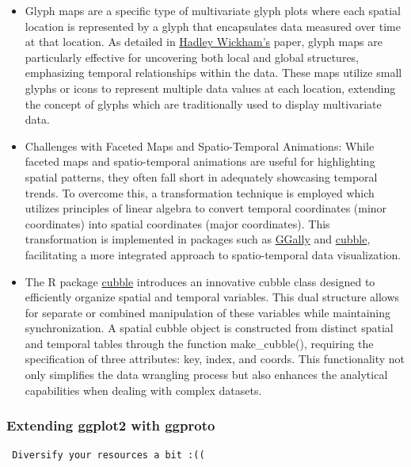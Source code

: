 \begin{itemize}
\item
  Glyph maps are a specific type of multivariate glyph plots where each spatial location is represented by a glyph that encapsulates data measured over time at that location. As detailed in \href{https://vita.had.co.nz/papers/glyph-maps.pdf}{Hadley Wickham's} paper, glyph maps are particularly effective for uncovering both local and global structures, emphasizing temporal relationships within the data. These maps utilize small glyphs or icons to represent multiple data values at each location, extending the concept of glyphs which are traditionally used to display multivariate data.
\item
  Challenges with Faceted Maps and Spatio-Temporal Animations: While faceted maps and spatio-temporal animations are useful for highlighting spatial patterns, they often fall short in adequately showcasing temporal trends. To overcome this, a transformation technique is employed which utilizes principles of linear algebra to convert temporal coordinates (minor coordinates) into spatial coordinates (major coordinates). This transformation is implemented in packages such as \href{https://cran.r-project.org/web/packages/GGally/GGally.pdf}{GGally} and \href{https://www.jstatsoft.org/article/view/v110i07}{cubble}, facilitating a more integrated approach to spatio-temporal data visualization.
\item
  The R package \href{https://www.jstatsoft.org/article/view/v110i07}{cubble} introduces an innovative cubble class designed to efficiently organize spatial and temporal variables. This dual structure allows for separate or combined manipulation of these variables while maintaining synchronization. A spatial cubble object is constructed from distinct spatial and temporal tables through the function make\_cubble(), requiring the specification of three attributes: key, index, and coords. This functionality not only simplifies the data wrangling process but also enhances the analytical capabilities when dealing with complex datasets.
\end{itemize}

\hypertarget{extending-ggplot2-with-ggproto}{%
\subsubsection{Extending ggplot2 with ggproto}\label{extending-ggplot2-with-ggproto}}

\begin{verbatim}
 Diversify your resources a bit :((
\end{verbatim}

